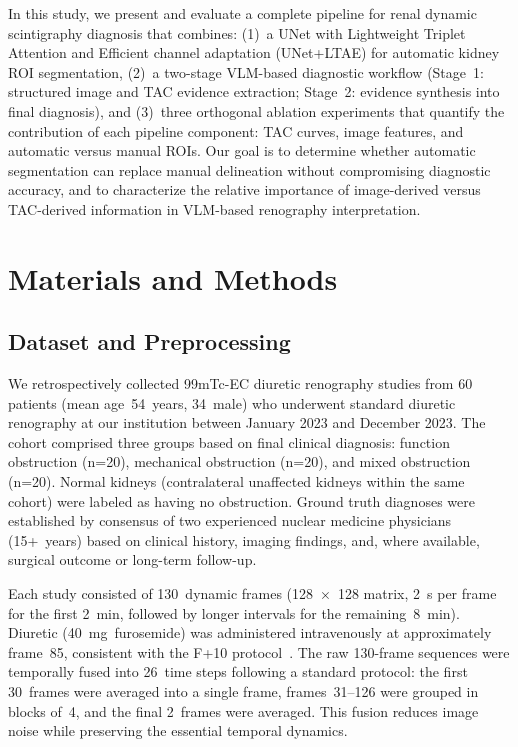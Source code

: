 \documentclass[sn-basic]{sn-jnl}
\begin{document}
In this study, we present and evaluate a complete pipeline
for renal dynamic scintigraphy diagnosis that combines:
(1)~a UNet with Lightweight Triplet Attention and Efficient
channel adaptation (UNet+LTAE) for automatic kidney ROI
segmentation, (2)~a two-stage VLM-based diagnostic workflow
(Stage~1: structured image and TAC evidence extraction;
Stage~2: evidence synthesis into final diagnosis), and
(3)~three orthogonal ablation experiments that quantify the
contribution of each pipeline component: TAC curves, image
features, and automatic versus manual ROIs.  Our goal is to
determine whether automatic segmentation can replace manual
delineation without compromising diagnostic accuracy, and to
characterize the relative importance of image-derived versus
TAC-derived information in VLM-based renography
interpretation.

\section{Materials and Methods}
\label{sec:methods}

\subsection{Dataset and Preprocessing}

We retrospectively collected 99mTc-EC diuretic renography
studies from 60 patients (mean age~54~years, 34~male) who
underwent standard diuretic renography at our institution
between January 2023 and December 2023.  The cohort
comprised three groups based on final clinical diagnosis:
function obstruction (n=20), mechanical obstruction (n=20),
and mixed obstruction (n=20).  Normal kidneys (contralateral
unaffected kidneys within the same cohort) were labeled as
having no obstruction.  Ground truth diagnoses were
established by consensus of two experienced nuclear medicine
physicians (15+~years) based on clinical history, imaging
findings, and, where available, surgical outcome or
long-term follow-up.

Each study consisted of 130~dynamic frames (128~$\times$~128
matrix, 2~s per frame for the first 2~min, followed by
longer intervals for the remaining~8~min).  Diuretic
(40~mg~furosemide) was administered intravenously at
approximately frame~85, consistent with the F+10
protocol~\cite{official}.  The raw 130-frame sequences were
temporally fused into 26~time steps following a standard
protocol: the first 30~frames were averaged into a single
frame, frames~31--126 were grouped in blocks of~4, and the
final 2~frames were averaged.  This fusion reduces image
noise while preserving the essential temporal dynamics.
\end{document}
